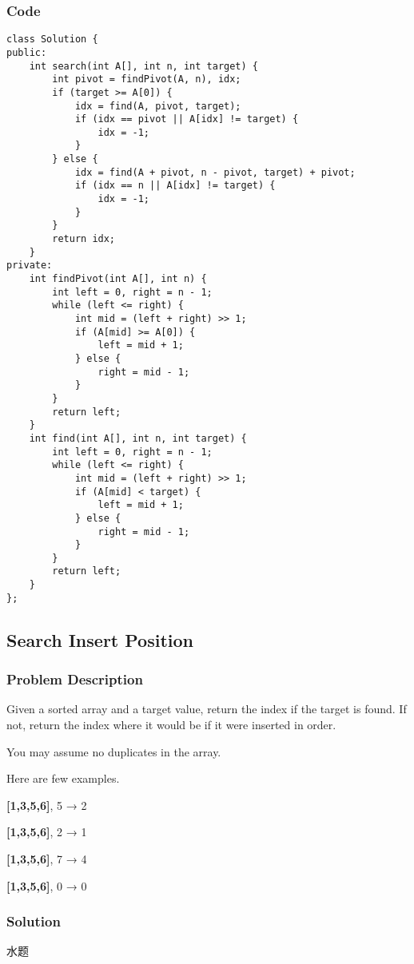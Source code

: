 \documentclass[courier]{article}
\begin{document}
\begin{CJK*}{UTF8}{gkai}
\subsubsection*{Code}
\begin{lstlisting}
class Solution {
public:
    int search(int A[], int n, int target) {
        int pivot = findPivot(A, n), idx;
        if (target >= A[0]) {
            idx = find(A, pivot, target);
            if (idx == pivot || A[idx] != target) {
                idx = -1;
            }
        } else {
            idx = find(A + pivot, n - pivot, target) + pivot;
            if (idx == n || A[idx] != target) {
                idx = -1;
            }
        }
        return idx;
    }
private:
    int findPivot(int A[], int n) {
        int left = 0, right = n - 1;
        while (left <= right) {
            int mid = (left + right) >> 1;
            if (A[mid] >= A[0]) {
                left = mid + 1;
            } else {
                right = mid - 1;
            }
        }
        return left;
    }
    int find(int A[], int n, int target) {
        int left = 0, right = n - 1;
        while (left <= right) {
            int mid = (left + right) >> 1;
            if (A[mid] < target) {
                left = mid + 1;
            } else {
                right = mid - 1;
            }
        }
        return left;
    }
}; 
\end{lstlisting}


\subsection{ Search Insert Position }

\subsubsection*{Problem Description}
Given a sorted array and a target value, return the index if the target is found. If not, return the index where it would be if it were inserted in order.

You may assume no duplicates in the array.

Here are few examples.


\textbf{[1,3,5,6]}, 5 → 2


\textbf{[1,3,5,6]}, 2 → 1


\textbf{[1,3,5,6]}, 7 → 4


\textbf{[1,3,5,6]}, 0 → 0



\subsubsection*{Solution}
水题


\end{CJK*}
\end{document}
